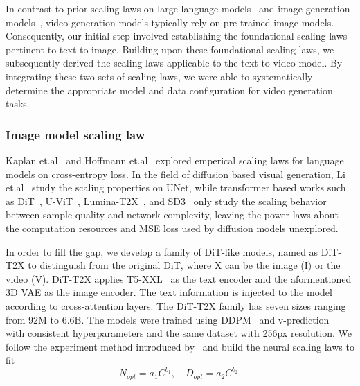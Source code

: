 In contrast to prior scaling laws on large language models~\cite{kaplan2020scaling,hoffmann2022training,touvron2023llama,achiam2023gpt,anil2023palm} and image generation models~\cite{li2024scalability,kilian2024computational}, video generation models typically rely on pre-trained image models. Consequently, our initial step involved establishing the foundational scaling laws pertinent to text-to-image. Building upon these foundational scaling laws, we subsequently derived the scaling laws applicable to the text-to-video model. By integrating these two sets of scaling laws, we were able to systematically determine the appropriate model and data configuration for video generation tasks. 


\subsubsection{Image model scaling law}

Kaplan et.al~\cite{kaplan2020scaling} and Hoffmann et.al~\cite{hoffmann2022training} explored emperical scaling laws for language models on cross-entropy loss. In the field of diffusion based visual generation, Li et.al~\cite{li2024scalability} study the scaling properties on UNet, while transformer based works such as DiT~\cite{peebles2023scalable}, U-ViT~\cite{bao2023all}, Lumina-T2X~\cite{gao2024lumina}, and SD3~\cite{esser2024scaling} only study the scaling behavior between sample quality and network complexity, leaving the power-laws about the computation resources and MSE loss used by diffusion models unexplored.

In order to fill the gap, we develop a family of DiT-like models, named as DiT-T2X to distinguish from the original DiT, where X can be the image (I) or the video (V).
DiT-T2X applies T5-XXL~\cite{raffel2020exploring} as the text encoder and the aformentioned 3D VAE as the image encoder. The text information is injected to the model according to cross-attention layers. The DiT-T2X family has seven sizes ranging from 92M to 6.6B. The models were trained using DDPM~\cite{ho2020denoising} and v-prediction~\cite{salimans2022progressive} with consistent hyperparameters and the same dataset with 256px resolution. We follow the experiment method introduced by~\cite{hoffmann2022training} and build the neural scaling laws to fit 
\begin{equation}\label{eq:scaling_law}
N_{opt}=a_1C^{b_1},\quad D_{opt}=a_2C^{b_2}.    
\end{equation}

